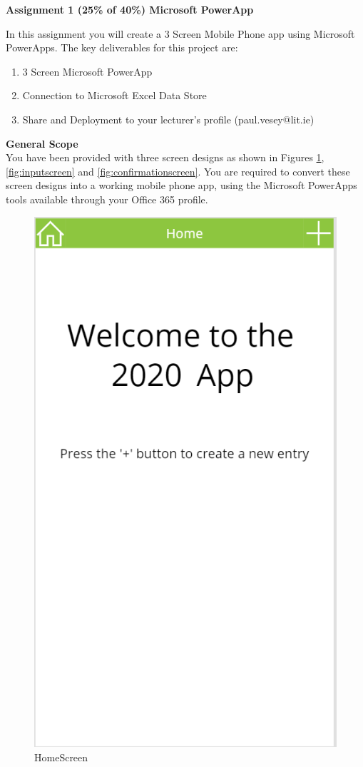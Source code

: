 
	
\begin{flushleft}
\Large\textbf{Assignment 1 (25\% of 40\%) Microsoft PowerApp}\\
\end{flushleft}

In this assignment you will create a 3 Screen Mobile Phone app using Microsoft PowerApps.  The key deliverables for this project are:

\begin{enumerate}
	\item 3 Screen Microsoft PowerApp
	\item Connection to Microsoft Excel Data Store
	\item Share and Deployment to your lecturer's profile (paul.vesey@lit.ie) 
\end{enumerate}

\textbf{General Scope}\\


You have been provided with three screen designs as shown in Figures \ref{fig:homescreen}, \ref{fig:inputscreen} and \ref{fig:confirmationscreen}.  You are required to convert these screen designs into a working mobile phone app, using the Microsoft PowerApps tools available through your Office 365 profile.

\vspace{0.5cm}

\begin{figure}[th]
	\centering
	\includegraphics[width=0.7\linewidth]{img/HomeScreen}
	\caption[HomeScreen]{HomeScreen}
	\label{fig:homescreen}
\end{figure}


